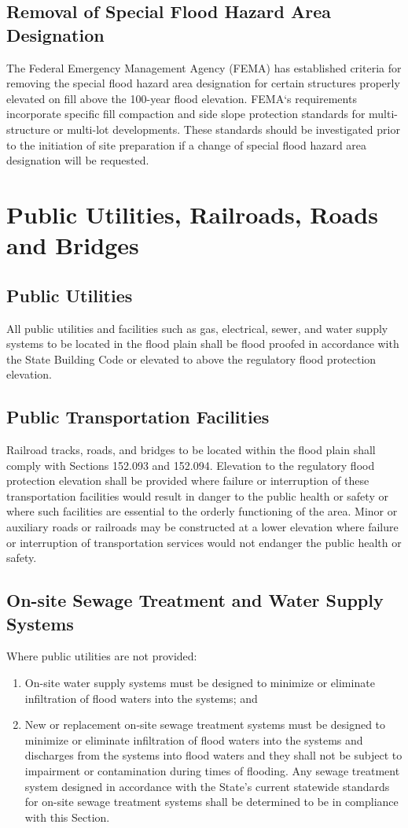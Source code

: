 \subsection{Removal of Special Flood Hazard Area Designation}
The Federal Emergency Management Agency (FEMA) has established criteria for removing the special flood hazard area designation for certain structures properly elevated on fill above the 100-year flood elevation. FEMA‘s requirements incorporate specific fill compaction and side slope protection standards for multi-structure or multi-lot developments. These standards should be investigated prior to the initiation of site preparation if a change of special flood hazard area designation will be requested.
\section{Public Utilities, Railroads, Roads and Bridges}
\subsection{Public Utilities}
All public utilities and facilities such as gas, electrical, sewer, and water supply systems to be located in the flood plain shall be flood proofed in accordance with the State Building Code or elevated to above the regulatory flood protection elevation.
\subsection{Public Transportation Facilities}
Railroad tracks, roads, and bridges to be located within the flood plain shall comply with Sections 152.093 and 152.094. Elevation to the regulatory flood protection elevation shall be provided where failure or interruption of these transportation facilities would result in danger to the public health or safety or where such facilities are essential to the orderly functioning of the area. Minor or auxiliary roads or railroads may be constructed at a lower elevation where failure or interruption of transportation services would not endanger the public health or safety.
\subsection{On-site Sewage Treatment and Water Supply Systems}
Where public utilities are not provided:
\begin{enumerate}[{\indent}1)]
    \item On-site water supply systems must be designed to minimize or eliminate infiltration of flood waters into the systems; and
    \item New or replacement on-site sewage treatment systems must be designed to minimize or eliminate infiltration of flood waters into the systems and discharges from the systems into flood waters and they shall not be subject to impairment or contamination during times of flooding. Any sewage treatment system designed in accordance with the State's current statewide standards for on-site sewage treatment systems shall be determined to be in compliance with this Section.
\end{enumerate}

